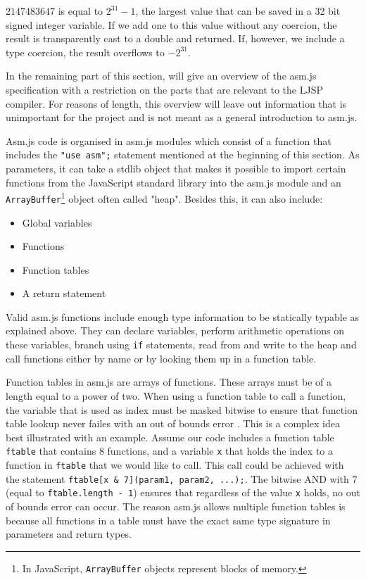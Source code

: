 \documentclass[11pt]{report}
\begin{document}
$2147483647$ is equal to $2^{31}-1$, the largest value that can be saved in a 32 bit signed integer variable. If we add one to this value without any coercion, the result is transparently cast to a double and returned. If, however, we include a type coercion, the result overflows to $-2^{31}$.

In the remaining part of this section, will give an overview of the asm.js specification with a restriction on the parts that are relevant to the LJSP compiler. For reasons of length, this overview will leave out information that is unimportant for the project and is not meant as a general introduction to asm.js.

Asm.js code is organised in asm.js modules which consist of a function that includes the \texttt{"use asm";} statement mentioned at the beginning of this section. As parameters, it can take a stdlib object that makes it possible to import certain functions from the JavaScript standard library into the asm.js module and an \texttt{ArrayBuffer}\footnote{In JavaScript, \texttt{ArrayBuffer} objects represent blocks of memory.} object often called "heap". Besides this, it can also include:
\begin{itemize}
\item Global variables
\item Functions
\item Function tables
\item A return statement
\end{itemize}

Valid asm.js functions include enough type information to be statically typable as explained above. They can declare variables, perform arithmetic operations on these variables, branch using \texttt{if} statements, read from and write to the heap and call functions either by name or by looking them up in a function table.

Function tables in asm.js are arrays of functions. These arrays must be of a length equal to a power of two. When using a function table to call a function, the variable that is used as index must be masked bitwise to ensure that function table lookup never failes with an out of bounds error \cite{asmjspdf}. This is a complex idea best illustrated with an example. Assume our code includes a function table \texttt{ftable} that contains $8$ functions, and a variable \texttt{x} that holds the index to a function in \texttt{ftable} that we would like to call. This call could be achieved with the statement \texttt{ftable[x \& 7](param1, param2, ...);}. The bitwise AND with $7$ (equal to \texttt{ftable.length - 1}) ensures that regardless of the value \texttt{x} holds, no out of bounds error can occur. The reason asm.js allows multiple function tables is because all functions in a table must have the exact same type signature in parameters and return types.
\end{document}
